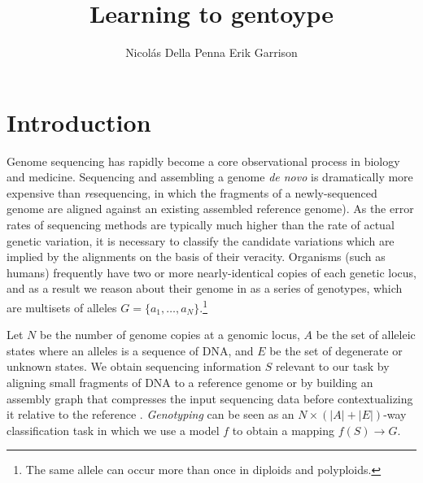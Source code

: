 \documentclass{article}
\title{Learning to gentoype}
\author{
Nicol\'as Della Penna
\And
Erik Garrison \\
} %
\begin{document}

\maketitle

\begin{abstract}


\end{abstract}

\section{Introduction}



Genome sequencing has rapidly become a core observational process in biology and medicine.
Sequencing and assembling a genome \emph{de novo} is dramatically more expensive than \emph{re}sequencing, in which the fragments of a newly-sequenced genome are aligned against an existing assembled reference genome).
As the error rates of sequencing methods are typically much higher than the rate of actual genetic variation, it is necessary to classify the candidate variations which are implied by the alignments on the basis of their veracity.
Organisms (such as humans) frequently have two or more nearly-identical copies of each genetic locus, and as a result we reason about their genome in as a series of genotypes, which are multisets of alleles $G = \{ a_1, \ldots, a_N \}$.\footnote{The same allele can occur more than once in diploids and polyploids.} 

Let $N$ be the number of genome copies at a genomic locus, $A$ be the set of alleleic states where an alleles is a sequence of DNA, and $E$ be the set of degenerate or unknown states.
We obtain sequencing information $S$ relevant to our task by aligning small fragments of DNA to a reference genome \cite{li2013bwamem} or by building an assembly graph that compresses the input sequencing data before contextualizing it relative to the reference \cite{myers2005, simpson2010, li2015fermikit, iqbal2012}.
\emph{Genotyping} can be seen as an $N \times ( |A| + |E| )$-way classification task in which we use a model $f$ to obtain a mapping $f(S) \to G$.

\end{document}
